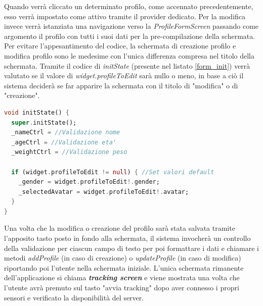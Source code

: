 \documentclass[target=bach,aauheader=,style=]{thud}
\begin{document}
Quando verrà cliccato un determinato profilo, come accennato precedentemente, esso verrà impostato come attivo tramite il provider dedicato. Per la modifica invece verrà istanziata una navigazione verso la \textit{ProfileFormScreen} passando come argomento il profilo con tutti i suoi dati per la pre-compilazione della schermata. Per evitare l'appesantimento del codice, la schermata di creazione profilo e modifica profilo sono le medesime con l'unica differenza compresa nel titolo della schermata.
Tramite il codice di \textit{initState} (presente nel listato \ref{form_init}) verrà valutato se il valore di \textit{widget.profileToEdit} sarà nullo o meno, in base a ciò il sistema deciderà se far apparire la schermata con il titolo di "modifica" o di "creazione".\\


\begin{lstlisting}[language=dart, caption={Pre-compilazione dei campi di testo in caso di modifica.}, label={form_init}]
void initState() {
  super.initState();
  _nameCtrl = //Validazione nome
  _ageCtrl = //Validazione eta'
  _weightCtrl = //Validazione peso
  
  if (widget.profileToEdit != null) { //Set valori default
    _gender = widget.profileToEdit!.gender;
    _selectedAvatar = widget.profileToEdit!.avatar;
  }
}
\end{lstlisting}

Una volta che la modifica o creazione del profilo sarà stata salvata tramite l'apposito tasto posto in fondo alla schermata, il sistema invocherà un controllo della validazione per ciascun campo di testo per poi formattare i dati e chiamare i metodi \textit{addProfile} (in caso di creazione) o \textit{updateProfile} (in caso di modifica) riportando poi l'utente nella schermata iniziale.
L'unica schermata rimanente dell'applicazione si chiama \textit{\textbf{tracking screen}} e viene mostrata una volta che l'utente avrà premuto sul tasto "avvia tracking" dopo aver connesso i propri sensori e verificato la disponibilità del server.
\end{document}

